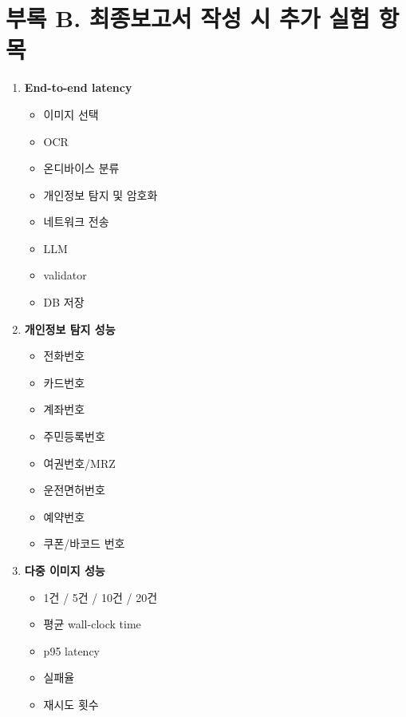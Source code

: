 \documentclass[11pt,a4paper]{article}
\begin{document}
\newpage

\section*{부록 B. 최종보고서 작성 시 추가 실험 항목}

\begin{enumerate}
    \item \textbf{End-to-end latency}
    \begin{itemize}
        \item 이미지 선택
        \item OCR
        \item 온디바이스 분류
        \item 개인정보 탐지 및 암호화
        \item 네트워크 전송
        \item LLM
        \item validator
        \item DB 저장
    \end{itemize}

    \item \textbf{개인정보 탐지 성능}
    \begin{itemize}
        \item 전화번호
        \item 카드번호
        \item 계좌번호
        \item 주민등록번호
        \item 여권번호/MRZ
        \item 운전면허번호
        \item 예약번호
        \item 쿠폰/바코드 번호
    \end{itemize}

    \item \textbf{다중 이미지 성능}
    \begin{itemize}
        \item 1건 / 5건 / 10건 / 20건
        \item 평균 wall-clock time
        \item p95 latency
        \item 실패율
        \item 재시도 횟수
    \end{itemize}


\end{enumerate}
\end{document}
